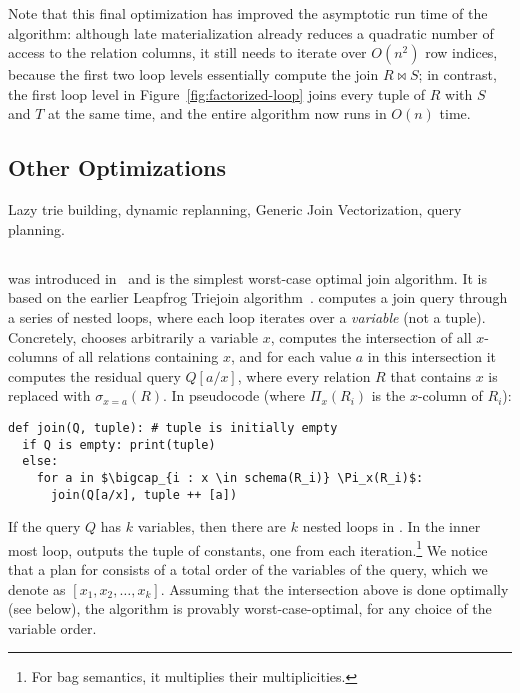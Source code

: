 Note that this final optimization has improved the asymptotic
run time of the algorithm:
although late materialization already reduces a quadratic
number of access to the relation columns,
it still needs to iterate over $O(n^2)$ row indices,
because the first two loop levels essentially compute
the join $R \bowtie S$;
in contrast, the first loop level in Figure~\ref{fig:factorized-loop}
joins every tuple of $R$ with $S$ and $T$ at the same time,
and the entire algorithm now runs in $O(n)$ time.

\subsection{Other Optimizations}
Lazy trie building, dynamic replanning, Generic Join
Vectorization, query planning.

\subsection{\GJ}\label{sec:background:gj}

\GJ was introduced in~\cite{DBLP:journals/sigmod/NgoRR13} and is the
simplest worst-case optimal join algorithm.  It is based on the
earlier Leapfrog Triejoin algorithm~\cite{DBLP:conf/icdt/Veldhuizen14}.
%
\GJ computes a join query through a series of nested
loops, where each loop iterates over a {\em variable} (not a tuple).
Concretely, \GJ chooses arbitrarily a variable $x$, computes the
intersection of all $x$-columns of all relations containing $x$, and
for each value $a$ in this intersection it computes the residual query
$Q[a/x]$, where every relation $R$ that contains $x$ is replaced with
$\sigma_{x=a}(R)$.  In pseudocode (where $\Pi_x (R_i)$ is the $x$-column of $R_i$):
%
\begin{lstlisting}[basicstyle=\ttfamily]
def join(Q, tuple): # tuple is initially empty
  if Q is empty: print(tuple)
  else:
    for a in $\bigcap_{i : x \in schema(R_i)} \Pi_x(R_i)$:
      join(Q[a/x], tuple ++ [a])
\end{lstlisting}
%
If the query $Q$ has $k$ variables, then there are $k$ nested loops in
\GJ.  In the inner most loop, \GJ outputs the tuple of constants, one
from each iteration.\footnote{For bag semantics, it multiplies their
  multiplicities.}  We notice that a plan for \GJ consists of a total
order of the variables of the query, which we denote as
$[x_1, x_2, \ldots, x_k]$.  Assuming that the intersection above is
done optimally (see below), the algorithm is provably
worst-case-optimal, for any choice of the variable order.

